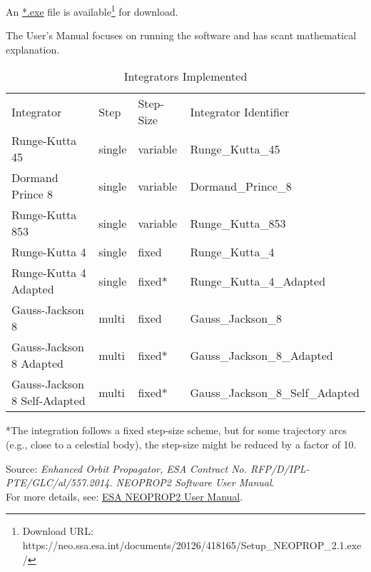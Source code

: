 \documentclass[a4paper,10pt]{article}
\begin{document}
An \href{https://neo.ssa.esa.int/documents/20126/418165/Setup\_NEOPROP\_2.1.exe/}{*.exe} file is available\footnote{Download URL: https://neo.ssa.esa.int/documents/20126/418165/Setup\_NEOPROP\_2.1.exe/} for download.

The User's Manual focuses on running the software and has scant mathematical explanation.


\begin{table}[h!]
\centering
\caption{Integrators Implemented}
\begin{tabular}{llll}
Integrator             & Step & Step-Size   & Integrator Identifier \\
Runge-Kutta 45         & single            & variable    & Runge\_Kutta\_45      \\
Dormand Prince 8       & single            & variable    & Dormand\_Prince\_8    \\
Runge-Kutta 853        & single            & variable    & Runge\_Kutta\_853     \\
Runge-Kutta 4          & single            & fixed       & Runge\_Kutta\_4       \\
Runge-Kutta 4 Adapted  & single            & fixed*      & Runge\_Kutta\_4\_Adapted \\
Gauss-Jackson 8        & multi             & fixed       & Gauss\_Jackson\_8     \\
Gauss-Jackson 8 Adapted & multi            & fixed*      & Gauss\_Jackson\_8\_Adapted \\
Gauss-Jackson 8 Self-Adapted & multi      & fixed*      & Gauss\_Jackson\_8\_Self\_Adapted \\
\end{tabular}

\begin{flushleft}
*The integration follows a fixed step-size scheme, but for some trajectory arcs (e.g., close to a celestial body), the step-size might be reduced by a factor of 10.

Source: \textit{Enhanced Orbit Propagator, ESA Contract No. RFP/D/IPL-PTE/GLC/al/557.2014. NEOPROP2 Software User Manual}.\\
For more details, see: \href{https://neo.ssa.esa.int/documents/20126/418165/propagator-manual.pdf/8e36ff2a-f499-a031-77bb-0bf917810d97?t=1559724493027#page=42}{ESA NEOPROP2 User Manual}.
\end{flushleft}
\end{table}
\end{document}
